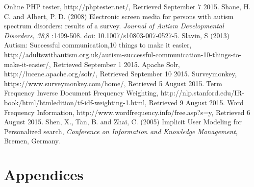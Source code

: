 \documentclass[a4paper, 11pt]{article}
\begin{document}
\begin{thebibliography}{100}
 Online PHP tester, http://phptester.net/, Retrieved September 7 2015.
Shane, H. C. and Albert, P. D. (2008) Electronic screen media for persons with autism spectrum disorders: results of a survey. \textit{Journal of Autism Developmental Disorders, 38},8 :1499-508. doi: 10.1007/s10803-007-0527-5.
 Slavin, S (2013) Autism: Successful communication,10 things to make it easier, http://adultswithautism.org.uk/autism-successful-communication-10-things-to-make-it-easier/, Retrieved September 1 2015.
 Apache Solr, http://lucene.apache.org/solr/, Retrieved September 10 2015.
Surveymonkey, https://www.surveymonkey.com/home/, Retrieved 5 August 2015.
 Term Frequency Inverse Document Frequency Weighting, http://nlp.stanford.edu/IR-book/html/htmledition/tf-idf-weighting-1.html, Retrieved 9 August 2015.
 Word Frequency Information, http://www.wordfrequency.info/free.asp?s=y, Retrieved 6 August 2015.
Shen, X., Tan, B. and Zhai, C. (2005) Implicit User Modeling for Personalized search, \textit{Conference on Information and Knowledge Management}, Bremen, Germany.
\end{thebibliography}





\newpage
\section {Appendices}

\newpage
\end{document}

